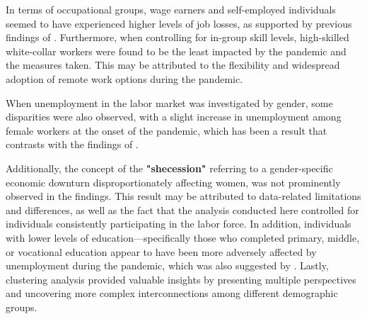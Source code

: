 \documentclass[a4paper,12pt]{article}
\begin{document}
In terms of occupational groups, wage earners and self-employed individuals seemed to have experienced higher levels of job losses, as supported by previous findings of \textbf{\cite{aygun2021}}. Furthermore, when controlling for in-group skill levels, high-skilled white-collar workers were found to be the least impacted by the pandemic and the measures taken. This may be attributed to the flexibility and widespread adoption of remote work options during the pandemic.

When unemployment in the labor market was investigated by gender, some disparities were also observed, with a slight increase in unemployment among female workers at the onset of the pandemic, which has been a result that contrasts with the findings of \textbf{\cite{aygun2021}}. 

Additionally, the concept of the \textbf{"shecession"} referring to a gender-specific economic downturn disproportionately affecting women, was not prominently observed in the findings. This result may be attributed to data-related limitations and differences, as well as the fact that the analysis conducted here controlled for individuals consistently participating in the labor force. In addition, individuals with lower levels of education—specifically those who completed primary, middle, or vocational education appear to have been more adversely affected by unemployment during the pandemic, which was also suggested by \textbf{\cite{montenovo2020}}. Lastly, clustering analysis provided valuable insights by presenting multiple perspectives and uncovering more complex interconnections among different demographic groups.
\end{document}
